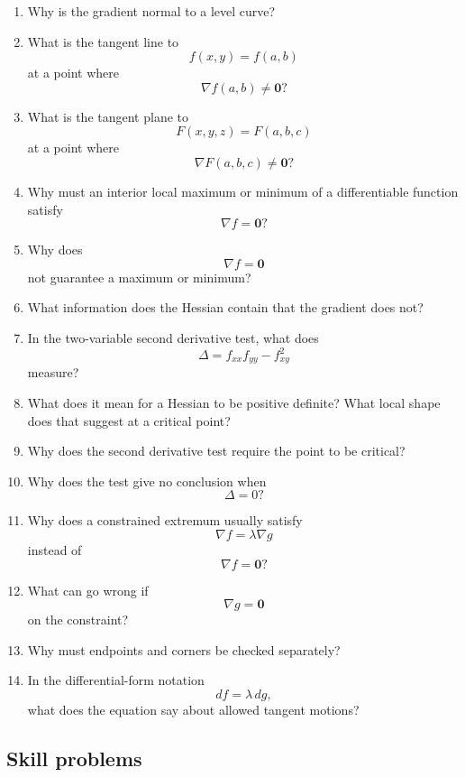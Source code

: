 \begin{enumerate}
\item Why is the gradient normal to a level curve?

\item What is the tangent line to
\[
    f(x,y)=f(a,b)
\]
at a point where
\[
    \nabla f(a,b)\ne\mathbf 0?
\]

\item What is the tangent plane to
\[
    F(x,y,z)=F(a,b,c)
\]
at a point where
\[
    \nabla F(a,b,c)\ne\mathbf 0?
\]

\item Why must an interior local maximum or minimum of a differentiable function
satisfy
\[
    \nabla f=\mathbf 0?
\]

\item Why does
\[
    \nabla f=\mathbf 0
\]
not guarantee a maximum or minimum?

\item What information does the Hessian contain that the gradient does not?

\item In the two-variable second derivative test, what does
\[
    \Delta=f_{xx}f_{yy}-f_{xy}^2
\]
measure?

\item What does it mean for a Hessian to be positive definite?  What local shape does
that suggest at a critical point?

\item Why does the second derivative test require the point to be critical?

\item Why does the test give no conclusion when
\[
    \Delta=0?
\]

\item Why does a constrained extremum usually satisfy
\[
    \nabla f=\lambda\nabla g
\]
instead of
\[
    \nabla f=\mathbf 0?
\]

\item What can go wrong if
\[
    \nabla g=\mathbf 0
\]
on the constraint?

\item Why must endpoints and corners be checked separately?

\item In the differential-form notation
\[
    df=\lambda\,dg,
\]
what does the equation say about allowed tangent motions?
\end{enumerate}

\subsection{Skill problems}

